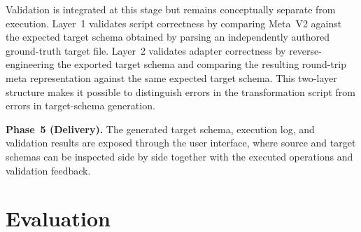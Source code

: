 \documentclass{llncs}
\begin{document}
Validation is integrated at this stage but remains conceptually separate from execution.
Layer~1 validates script correctness by comparing Meta~V2 against the expected target schema obtained by parsing an independently authored ground-truth target file.
Layer~2 validates adapter correctness by reverse-engineering the exported target schema and comparing the resulting round-trip meta representation against the same expected target schema.
This two-layer structure makes it possible to distinguish errors in the transformation script from errors in target-schema generation.

\textbf{Phase~5 (Delivery).}
The generated target schema, execution log, and validation results are exposed through the user interface, where source and target schemas can be inspected side by side together with the executed operations and validation feedback.

\section{Evaluation}
\label{sec:evaluation}
\end{document}
